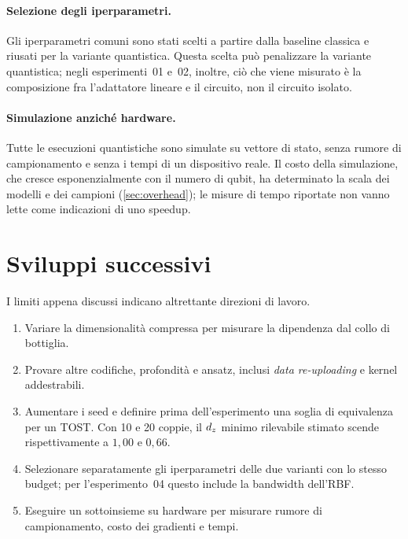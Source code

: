 \paragraph{Selezione degli iperparametri.} Gli iperparametri comuni sono stati
scelti a partire dalla baseline classica e riusati per la variante quantistica.
Questa scelta può penalizzare la variante quantistica; negli esperimenti~01 e~02,
inoltre, ciò che viene misurato è la composizione fra l'adattatore lineare e il
circuito, non il circuito isolato.

\paragraph{Simulazione anziché hardware.} Tutte le esecuzioni quantistiche sono
simulate su vettore di stato, senza rumore di campionamento e senza i tempi di un
dispositivo reale. Il costo della simulazione, che cresce esponenzialmente con il
numero di qubit, ha determinato la scala dei modelli e dei campioni
(\cref{sec:overhead}); le misure di tempo riportate non vanno lette come
indicazioni di uno speedup.

\section{Sviluppi successivi}
\label{sec:sviluppi}

I limiti appena discussi indicano altrettante direzioni di lavoro.

\begin{enumerate}
  \item Variare la dimensionalità compressa per misurare la dipendenza dal collo
    di bottiglia.
  \item Provare altre codifiche, profondità e ansatz, inclusi \emph{data
    re-uploading} e kernel addestrabili.
  \item Aumentare i seed e definire prima dell'esperimento una soglia di
    equivalenza per un TOST. Con 10 e 20 coppie, il $d_z$ minimo rilevabile
    stimato scende rispettivamente a $1{,}00$ e $0{,}66$.
  \item Selezionare separatamente gli iperparametri delle due varianti con lo
    stesso budget; per l'esperimento~04 questo include la bandwidth dell'RBF.
  \item Eseguire un sottoinsieme su hardware per misurare rumore di
    campionamento, costo dei gradienti e tempi.
\end{enumerate}
